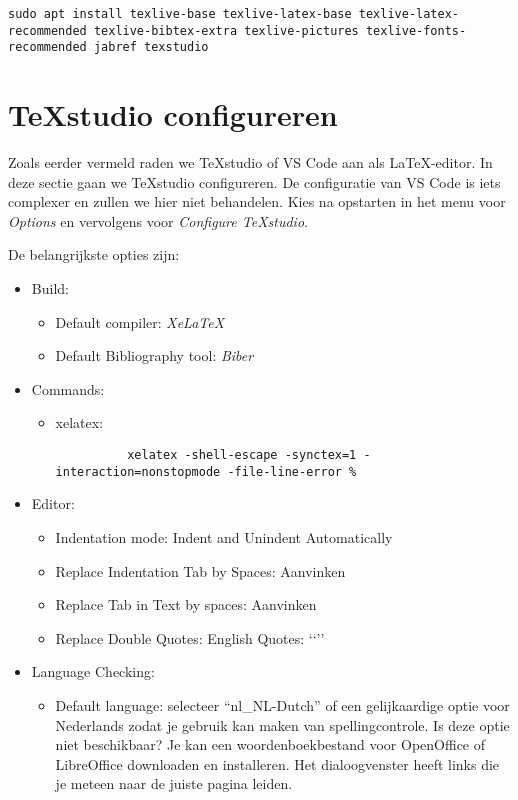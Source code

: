 \begin{verbatim}
sudo apt install texlive-base texlive-latex-base texlive-latex-recommended texlive-bibtex-extra texlive-pictures texlive-fonts-recommended jabref texstudio
\end{verbatim}

\section{{\TeX}studio configureren}%
\label{sec:texstudio-configureren}

Zoals eerder vermeld raden we {\TeX}studio of VS Code aan als {\LaTeX}-editor. In deze sectie gaan we {\TeX}studio configureren. De configuratie van VS Code is iets complexer en zullen we hier niet behandelen. Kies na opstarten in het menu voor \textit{Options} en vervolgens voor \textit{Configure {\TeX}studio}.

De belangrijkste opties zijn:

\begin{itemize}
  \item Build:
    \begin{itemize}
      \item Default compiler: \textit{XeLaTeX}
      \item Default Bibliography tool: \textit{Biber}
    \end{itemize}
  \item Commands:
    \begin{itemize}
      \item xelatex:
      
        \begin{verbatim}
          xelatex -shell-escape -synctex=1 -interaction=nonstopmode -file-line-error %
        \end{verbatim}

    \end{itemize}
  \item Editor:
    \begin{itemize}
      \item Indentation mode: Indent and Unindent Automatically
      \item Replace Indentation Tab by Spaces: Aanvinken
      \item Replace Tab in Text by spaces: Aanvinken
      \item Replace Double Quotes: English Quotes: ‘‘’’
    \end{itemize}
  \item Language Checking:
    \begin{itemize}
      \item Default language: selecteer ``nl\_NL-Dutch'' of een gelijkaardige optie voor Nederlands zodat je gebruik kan maken van spellingcontrole. Is deze optie niet beschikbaar? Je kan een woordenboekbestand voor OpenOffice of LibreOffice downloaden en installeren. Het dialoogvenster heeft links die je meteen naar de juiste pagina leiden.
    \end{itemize}
\end{itemize}


